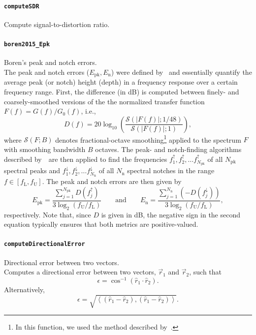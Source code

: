 \documentclass[11pt, oneside]{article}
\newcommand{\function}[1]{\paragraph*{\texttt{#1}}}
\begin{document}
\function{computeSDR} Compute signal-to-distortion ratio. \\

\function{boren2015\_Epk} Boren's peak and notch errors. \\
The peak and notch errors ($E_{\text{pk}}, E_\text{n}$) were defined by~\citet{Boren2015}
and essentially quantify the average peak (or notch) height (depth) in a frequency response over a certain frequency range.
First, the difference (in dB) is computed between finely- and coarsely-smoothed versions of the the normalized transfer function $F(f) = G(f)/G_0(f)$, i.e.,
\begin{equation}
D(f) = 20 \log_{10} \left( \frac{ \mathcal{S}\left( |F(f)|; 1/48 \right) }{ \mathcal{S}\left( |F(f)|; 1 \right) } \right),
\end{equation}
where $\mathcal{S}(F; B)$ denotes fractional-octave smoothing\footnote{In this function, we used the method described by~\citet{Tylka2017}.} applied to the spectrum $F$ with smoothing bandwidth $B$ octaves.
The peak- and notch-finding algorithms described by~\citeauthor{Boren2015}~are then applied to find the frequencies $f_1^\uparrow, f_2^\uparrow, \dots f_{N_\text{pk}}^\uparrow$ of all $N_\text{pk}$ spectral peaks and $f_1^\downarrow, f_2^\downarrow, \dots f_{N_\text{n}}^\downarrow$  of all $N_\text{n}$ spectral notches in the range $f \in [f_\text{L}, f_\text{U}]$.
The peak and notch errors are then given by~\citep[Eq.~(1)]{Boren2015}
\begin{equation}
E_\text{pk} = \frac{\sum_{j = 1}^{N_\text{pk}} D(f_j^\uparrow)}{3 \log_2 (f_\text{U}/f_\text{L})}
\quad\quad\text{and}\quad\quad
E_\text{n} = \frac{\sum_{j = 1}^{N_\text{n}} (-D(f_j^\downarrow))}{3 \log_2 (f_\text{U}/f_\text{L})},
\end{equation}
respectively. Note that, since $D$ is given in dB, the negative sign in the second equation typically ensures that both metrics are positive-valued.

\function{computeDirectionalError} Directional error between two vectors. \\
Computes a directional error between two vectors, $\vec{r}_1$ and $\vec{r}_2$, such that
\begin{equation}
\epsilon = \cos^{-1} \left( \hat{r}_1 \cdot \hat{r}_2 \right).
\end{equation}
Alternatively,
\begin{equation}
\epsilon = \sqrt{ \left\langle \left( \hat{r}_1 - \hat{r}_2 \right), \left( \hat{r}_1 - \hat{r}_2 \right) \right\rangle }.
\end{equation}
\end{document}
